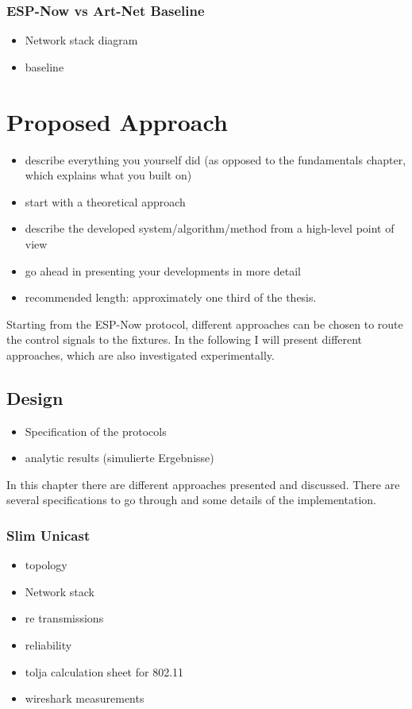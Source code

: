\documentclass[]{ccs-thesis}
\begin{document}
\subsection{ESP-Now vs Art-Net Baseline}
\begin{itemize}
\item Network stack diagram
\item baseline
\end{itemize}

\chapter{Proposed Approach}
\begin{itemize}
\item describe everything you yourself did (as opposed to the fundamentals chapter, which explains what you built on)
\item start with a theoretical approach
\item describe the developed system/algorithm/method from a high-level point of view
\item go ahead in presenting your developments in more detail
\item recommended length: approximately one third of the thesis.
\end{itemize}

Starting from the ESP-Now protocol, different approaches can be chosen to route the control signals to the fixtures. 
In the following I will present different approaches, which are also investigated experimentally.

\section{Design}
\label{sec:design}
\begin{itemize}
	\item Specification of the protocols
	\item analytic results (simulierte Ergebnisse)
\end{itemize}

In this chapter there are different approaches presented and discussed.
There are several specifications to go through and some details of the implementation.

\subsection{Slim Unicast}
\begin{itemize}
\item topology
\item Network stack
\item re transmissions
\item reliability
\item tolja calculation sheet for 802.11
\item wireshark measurements
\end{itemize}
\end{document}
